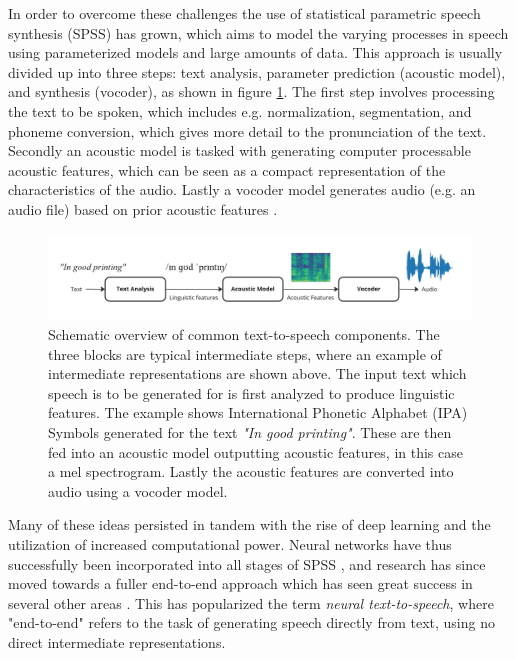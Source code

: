 \documentclass{report}
\begin{document}
In order to overcome these challenges the use of statistical parametric speech synthesis (SPSS) has grown, which aims to model the varying processes in speech using parameterized models and large amounts of data. This approach is usually divided up into three steps: text analysis, parameter prediction (acoustic model), and synthesis (vocoder), as shown in figure \ref{fig:TTS}. The first step involves processing the text to be spoken, which includes e.g. normalization, segmentation, and phoneme conversion, which gives more detail to the pronunciation of the text. Secondly an acoustic model is tasked with generating computer processable acoustic features, which can be seen as a compact representation of the characteristics of the audio. Lastly a vocoder model generates audio (e.g. an audio file) based on prior acoustic features \cite{zen2009statistical, tan2021survey}. 
\begin{figure}[H]
    \centering
    \includegraphics[scale=0.28]{images/TTS.jpg}
    \caption{\onehalfspacing Schematic overview of common text-to-speech components. The three blocks are typical intermediate steps, where an example of intermediate representations are shown above. The input text which speech is to be generated for is first analyzed to produce linguistic features. The example shows International Phonetic Alphabet (IPA) Symbols generated for the text \textit{"In good printing"}. These are then fed into an acoustic model outputting acoustic features, in this case a mel spectrogram. Lastly the acoustic features are converted into audio using a vocoder model.}
    \label{fig:TTS}
\end{figure}
Many of these ideas persisted in tandem with the rise of deep learning and the utilization of increased computational power. Neural networks have thus successfully been incorporated into all stages of SPSS \cite{ze2013statistical, arik2017deep}, and research has since moved towards a fuller end-to-end approach \cite{oord2016wavenet} which has seen great success in several other areas  \cite{krizhevsky2017imagenet, bojarski2016end, zhou2018voxelnet}. This has popularized the term \textit{neural text-to-speech}, where "end-to-end" refers to the task of generating speech directly from text, using no direct intermediate representations.
\end{document}
